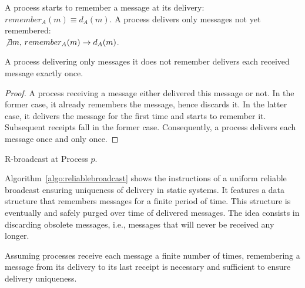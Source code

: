 \begin{definition}[Remembering]
  A process starts to remember a message at its delivery:
  $remember_A(m) \equiv d_A(m)$.  A process delivers only messages not yet
  remembered: \\ $\not\exists m,\, remember_A(m) \rightarrow d_A(m)$.
\end{definition}

\begin{theorem}
  A process delivering only messages it does not remember delivers each received
  message exactly once.
\end{theorem}

\begin{proof}
  A process receiving a message either delivered this message or not. In the
  former case, it already remembers the message, hence discards it. In the
  latter case, it delivers the message for the first time and starts to remember
  it. Subsequent receipts fall in the former case. Consequently, a process
  delivers each message once and only once.
\end{proof}


\begin{algorithm}[h]
  
  \caption{\label{algo:reliablebroadcast}R-broadcast at Process $p$.}
\end{algorithm}

Algorithm~\ref{algo:reliablebroadcast} shows the instructions of a uniform
reliable broadcast ensuring uniqueness of delivery in static systems. It
features a data structure that remembers messages for a finite period of time.
This structure is eventually and safely purged over time of delivered messages.
The idea consists in discarding obsolete messages, i.e., messages that will
never be received any longer.

\begin{theorem}
  Assuming processes receive each message a finite number of times, remembering
  a message from its delivery to its last receipt is necessary and sufficient to
  ensure delivery uniqueness.
\end{theorem}

